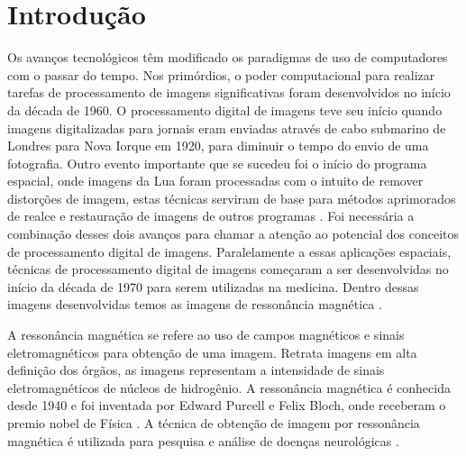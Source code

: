 \documentclass[openright]{UFRGS} %
\begin{document}
\listoftables


\tableofcontents

\chapter{Introdução}

Os avanços tecnológicos têm modificado os paradigmas de uso de
computadores com o passar do tempo. Nos primórdios, o poder computacional
para realizar tarefas de processamento de imagens significativas foram desenvolvidos no início da década de 1960. O processamento digital de imagens teve seu início  quando
imagens digitalizadas para jornais eram enviadas através de cabo submarino de Londres para Nova Iorque em 1920, para diminuir o tempo do envio de uma fotografia. Outro evento importante  que se  sucedeu foi o início do
programa espacial, onde imagens da Lua foram processadas com o intuito de remover distorções de imagem, estas técnicas serviram de base para métodos aprimorados de realce e restauração de imagens de outros programas \cite{gonzalez2010processamento}. Foi necessária a combinação desses dois avanços para chamar a atenção ao potencial dos conceitos de processamento digital de imagens. Paralelamente a essas aplicações espaciais, técnicas
de processamento digital de imagens começaram a ser desenvolvidas no início da década de 1970 para serem utilizadas na  medicina. Dentro dessas imagens desenvolvidas temos as imagens de ressonância magnética \cite{gonzalez2010processamento}. 


A ressonância magnética se refere ao uso de campos magnéticos e sinais eletromagnéticos para obtenção de uma imagem. Retrata  imagens em alta definição dos órgãos, as imagens representam a intensidade de sinais eletromagnéticos de núcleos de hidrogênio. A ressonância magnética é conhecida desde 1940 e foi inventada por Edward Purcell e Felix Bloch, onde receberam o premio nobel de Física \cite{nacif2011manual}. A técnica de obtenção de imagem por ressonância magnética  é  utilizada para pesquisa e análise de doenças neurológicas \cite{AmaroJunior2001AspectosMagnetica}. 
\end{document}
